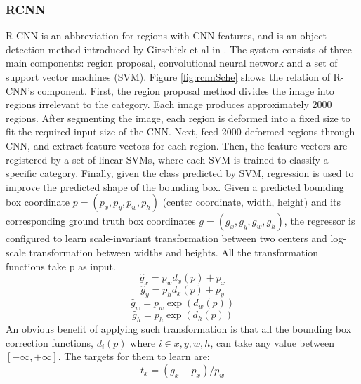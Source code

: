 \subsubsection{RCNN}
R-CNN is an abbreviation for regions with CNN features, and is an object detection method introduced by Girschick et al in \cite{DBLP:journals/corr/GirshickDDM13}. The system consists of three main components: region proposal, convolutional neural network and a set of support vector machines (SVM).
Figure \ref{fig:rcnnSche} shows the relation of R-CNN's component. First, the region proposal method divides the image into regions irrelevant to the category. Each image produces approximately 2000 regions. After segmenting the image, each region is deformed into a fixed size to fit the required input size of the CNN. Next, feed 2000 deformed regions through CNN, and extract feature vectors for each region. Then, the feature vectors are registered by a set of linear SVMs, where each SVM is trained to classify a specific category. Finally, given the class predicted by SVM, regression is used to improve the predicted shape of the bounding box. Given a predicted bounding box coordinate \(p=(p_x,p_y,p_w,p_h)\) (center coordinate, width, height) and its corresponding ground truth box coordinates \(g=(g_x,g_y,g_w,g_h )\), the regressor is configured to learn scale-invariant transformation between two centers and log-scale transformation between widths and heights. All the transformation functions take p as input.
\begin{equation}
	\hat g_x=p_w d_x (p)+p_x
\end{equation}
\begin{equation}
	\hat g_y=p_h d_x (p)+p_y
\end{equation}
\begin{equation}
	\hat g_w=p_w \exp{(d_w(p))}
\end{equation}
\begin{equation}
	\hat g_h=p_h \exp{(d_h(p))}
\end{equation}
An obvious benefit of applying such transformation is that all the bounding box correction functions, \(d_i (p)\) where \( i\in {x,y,w,h}\), can take any value between \([-\infty,+\infty]\). The targets for them to learn are:
\begin{equation}
	t_x=(g_x-p_x )/p_w
\end{equation}
